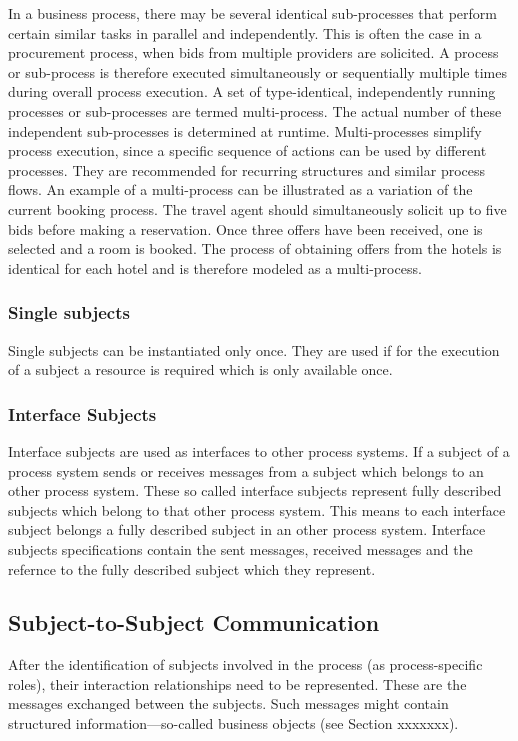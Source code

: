 In a business process, there may be several identical sub-processes that perform certain similar tasks in parallel and independently. This is often the case in a procurement process, when bids from multiple providers are solicited. A process or sub-process is therefore executed simultaneously or sequentially multiple times during overall process execution. A set of type-identical, independently running processes or sub-processes are termed multi-process. The actual number of these independent sub-processes is determined at runtime.
Multi-processes simplify process execution, since a specific sequence of actions can be used by different processes. They are recommended for recurring structures and similar process flows.
An example of a multi-process can be illustrated as a variation of the current booking process. The travel agent should simultaneously solicit up to five bids before making a reservation. Once three offers have been received, one is selected and a room is booked. The process of obtaining offers from the hotels is identical for each hotel and is therefore modeled as a multi-process.


\subsubsection{Single subjects}
Single subjects can be instantiated only once. They are used if for the execution of a subject a resource is required which is only available once.


\subsubsection{Interface Subjects}
Interface subjects are used as interfaces to other process systems. If a subject of a process system sends or receives messages from a subject which belongs to an other process system. These so called interface subjects represent fully described subjects which belong to that other process system. This means to each interface subject belongs a fully described subject in an other process system. Interface subjects specifications contain the sent messages, received messages and the refernce to the fully described subject which they represent.


\subsection{Subject-to-Subject Communication}
After the identification of subjects involved in the process (as process-specific roles), their interaction relationships need to be represented. These are the messages exchanged between the subjects. Such messages might contain structured information—so-called business objects (see Section xxxxxxx).\


